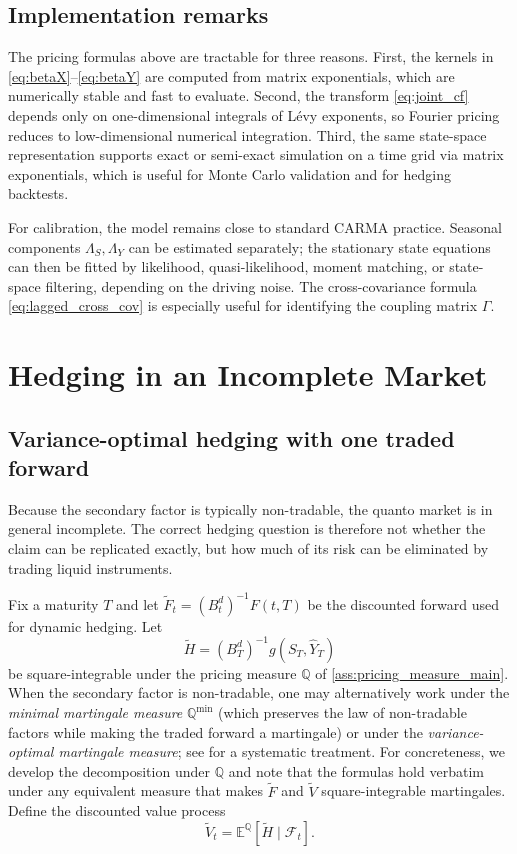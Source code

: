 \documentclass[10pt,reqno]{amsart}
\newcommand{\E}{\mathbb{E}}
\newcommand{\Q}{\mathbb{Q}}
\newcommand{\F}{\mathcal{F}}
\newcommand{\1}{\mathbbm{1}}
\begin{document}
\subsection{Implementation remarks}

The pricing formulas above are tractable for three reasons. First, the kernels in
\eqref{eq:betaX}--\eqref{eq:betaY} are computed from matrix exponentials, which
are numerically stable and fast to evaluate. Second, the transform
\eqref{eq:joint_cf} depends only on one-dimensional integrals of Lévy exponents,
so Fourier pricing reduces to low-dimensional numerical integration. Third, the
same state-space representation supports exact or semi-exact simulation on a
time grid via matrix exponentials, which is useful for Monte Carlo validation and
for hedging backtests.

For calibration, the model remains close to standard CARMA practice. Seasonal
components $\Lambda_S,\Lambda_Y$ can be estimated separately; the stationary
state equations can then be fitted by likelihood, quasi-likelihood, moment
matching, or state-space filtering, depending on the driving noise. The
cross-covariance formula \eqref{eq:lagged_cross_cov} is especially useful for
identifying the coupling matrix $\Gamma$.

\section{Hedging in an Incomplete Market}\label{sec:hedging-strategies}

\subsection{Variance-optimal hedging with one traded forward}

Because the secondary factor is typically non-tradable, the quanto market is in
general incomplete. The correct hedging question is therefore not whether the
claim can be replicated exactly, but how much of its risk can be eliminated by
trading liquid instruments.

Fix a maturity $T$ and let $\widetilde{F}_t = (B_t^d)^{-1}F(t,T)$ be the
discounted forward used for dynamic hedging. Let
$$
\widetilde{H} = (B_T^d)^{-1} g(S_T,\widehat{Y}_T)
$$
be square-integrable under the pricing measure $\Q$ of
\ref{ass:pricing_measure_main}. When the secondary
factor is non-tradable, one may alternatively work under the \emph{minimal
martingale measure} $\Q^{\min}$ (which preserves the law of non-tradable
factors while making the traded forward a martingale) or under the
\emph{variance-optimal martingale measure}; see \citet{Sch01} for a systematic
treatment. For concreteness, we develop the decomposition under $\Q$ and
note that the formulas hold verbatim under any equivalent measure that makes
$\widetilde{F}$ and $\widetilde{V}$ square-integrable martingales. Define
the discounted value process
$$
\widetilde{V}_t = \E^{\Q}[\widetilde{H}\mid\F_t].
$$
\end{document}
